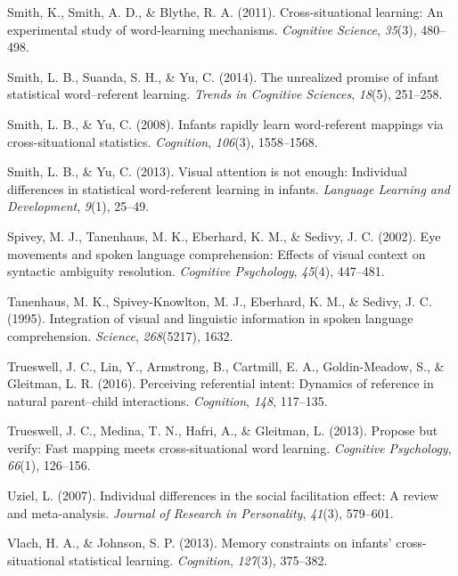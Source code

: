 \documentclass[oneside]{report}
\begin{document}
\leavevmode\hypertarget{ref-smith2011cross}{}%
Smith, K., Smith, A. D., \& Blythe, R. A. (2011). Cross-situational
learning: An experimental study of word-learning mechanisms.
\emph{Cognitive Science}, \emph{35}(3), 480--498.

\leavevmode\hypertarget{ref-smith2014unrealized}{}%
Smith, L. B., Suanda, S. H., \& Yu, C. (2014). The unrealized promise of
infant statistical word--referent learning. \emph{Trends in Cognitive
Sciences}, \emph{18}(5), 251--258.

\leavevmode\hypertarget{ref-smith2008infants}{}%
Smith, L. B., \& Yu, C. (2008). Infants rapidly learn word-referent
mappings via cross-situational statistics. \emph{Cognition},
\emph{106}(3), 1558--1568.

\leavevmode\hypertarget{ref-smith2013visual}{}%
Smith, L. B., \& Yu, C. (2013). Visual attention is not enough:
Individual differences in statistical word-referent learning in infants.
\emph{Language Learning and Development}, \emph{9}(1), 25--49.

\leavevmode\hypertarget{ref-spivey2002eye}{}%
Spivey, M. J., Tanenhaus, M. K., Eberhard, K. M., \& Sedivy, J. C.
(2002). Eye movements and spoken language comprehension: Effects of
visual context on syntactic ambiguity resolution. \emph{Cognitive
Psychology}, \emph{45}(4), 447--481.

\leavevmode\hypertarget{ref-tanenhaus1995integration}{}%
Tanenhaus, M. K., Spivey-Knowlton, M. J., Eberhard, K. M., \& Sedivy, J.
C. (1995). Integration of visual and linguistic information in spoken
language comprehension. \emph{Science}, \emph{268}(5217), 1632.

\leavevmode\hypertarget{ref-trueswell2016perceiving}{}%
Trueswell, J. C., Lin, Y., Armstrong, B., Cartmill, E. A.,
Goldin-Meadow, S., \& Gleitman, L. R. (2016). Perceiving referential
intent: Dynamics of reference in natural parent--child interactions.
\emph{Cognition}, \emph{148}, 117--135.

\leavevmode\hypertarget{ref-trueswell2013propose}{}%
Trueswell, J. C., Medina, T. N., Hafri, A., \& Gleitman, L. (2013).
Propose but verify: Fast mapping meets cross-situational word learning.
\emph{Cognitive Psychology}, \emph{66}(1), 126--156.

\leavevmode\hypertarget{ref-uziel2007individual}{}%
Uziel, L. (2007). Individual differences in the social facilitation
effect: A review and meta-analysis. \emph{Journal of Research in
Personality}, \emph{41}(3), 579--601.

\leavevmode\hypertarget{ref-vlach2013memory}{}%
Vlach, H. A., \& Johnson, S. P. (2013). Memory constraints on infants'
cross-situational statistical learning. \emph{Cognition}, \emph{127}(3),
375--382.
\end{document}
